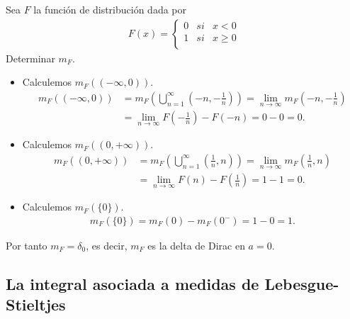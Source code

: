 \begin{ejemplo}
    Sea $F$ la función de distribución dada por
    \begin{align*}
        F(x) = \left\{ \begin{array}{lcc}
                           0 & si & x < 0   \\
                           1 & si & x \ge 0 \\
                       \end{array}
        \right.
    \end{align*}
    Determinar $m_F$.
    \begin{itemize}
        \item Calculemos $m_F((-\infty,0))$.
              \begin{align*}
                  m_F((-\infty,0)) & = m_F\left( \bigcup_{n=1}^{\infty}\left( -n, -\frac{1}{n}\right)\right) = \lim_{n \to \infty}{m_F}\left( -n, -\frac{1}{n}\right) \\
                                   & = \lim_{n \to \infty}{F\left(-\frac{1}{n}\right) - F(-n)} = 0 - 0 = 0.
              \end{align*}
        \item Calculemos $m_F((0,+\infty))$.
              \begin{align*}
                  m_F((0,+\infty)) & = m_F\left( \bigcup_{n=1}^{\infty}\left(\frac{1}{n}, n\right)\right) = \lim_{n \to \infty}{m_F}\left(\frac{1}{n}, n\right) \\
                                   & = \lim_{n \to \infty}{F(n) - F\left(\frac{1}{n}\right)} = 1 - 1 = 0 .
              \end{align*}
        \item Calculemos $m_F(\{0\})$.
              \begin{align*}
                  m_F(\{0\}) = m_F(0) - m_F(0^-) = 1 - 0 = 1.
              \end{align*}
    \end{itemize}
    Por tanto $m_F = \delta_0$, es decir, $m_F$ es la delta de Dirac en $a = 0$.
\end{ejemplo}

\subsection{La integral asociada a medidas de Lebesgue-Stieltjes}

